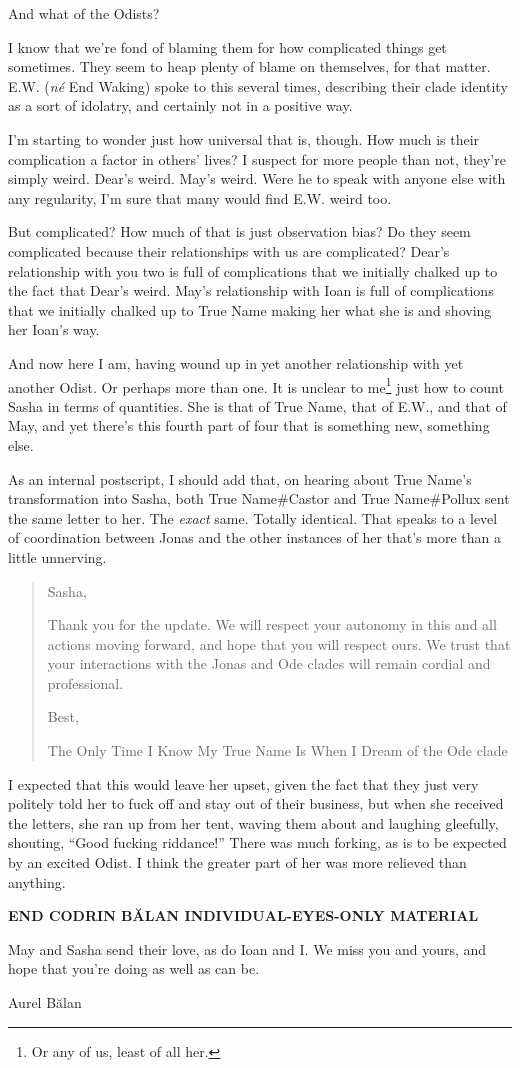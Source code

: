 And what of the Odists?

I know that we're fond of blaming them for how complicated things get sometimes. They seem to heap plenty of blame on themselves, for that matter. E.W. (\emph{né} End Waking) spoke to this several times, describing their clade identity as a sort of idolatry, and certainly not in a positive way.

I'm starting to wonder just how universal that is, though. How much is their complication a factor in others' lives? I suspect for more people than not, they're simply weird. Dear's weird. May's weird. Were he to speak with anyone else with any regularity, I'm sure that many would find E.W. weird too.

But complicated? How much of that is just observation bias? Do they seem complicated because their relationships with us are complicated? Dear's relationship with you two is full of complications that we initially chalked up to the fact that Dear's weird. May's relationship with Ioan is full of complications that we initially chalked up to True Name making her what she is and shoving her Ioan's way.

And now here I am, having wound up in yet another relationship with yet another Odist. Or perhaps more than one. It is unclear to me\footnote{Or any of us, least of all her.} just how to count Sasha in terms of quantities. She is that of True Name, that of E.W., and that of May, and yet there's this fourth part of four that is something new, something else.

As an internal postscript, I should add that, on hearing about True Name's transformation into Sasha, both True Name\#Castor and True Name\#Pollux sent the same letter to her. The \emph{exact} same. Totally identical. That speaks to a level of coordination between Jonas and the other instances of her that's more than a little unnerving.

\begin{quote}
Sasha,

Thank you for the update. We will respect your autonomy in this and all actions moving forward, and hope that you will respect ours. We trust that your interactions with the Jonas and Ode clades will remain cordial and professional.

Best,

The Only Time I Know My True Name Is When I Dream of the Ode clade
\end{quote}

I expected that this would leave her upset, given the fact that they just very politely told her to fuck off and stay out of their business, but when she received the letters, she ran up from her tent, waving them about and laughing gleefully, shouting, ``Good fucking riddance!'' There was much forking, as is to be expected by an excited Odist. I think the greater part of her was more relieved than anything.

\begin{center}
\textbf{END CODRIN BĂLAN INDIVIDUAL-EYES-ONLY MATERIAL}
\end{center}

May and Sasha send their love, as do Ioan and I. We miss you and yours, and hope that you're doing as well as can be.

Aurel Bălan
